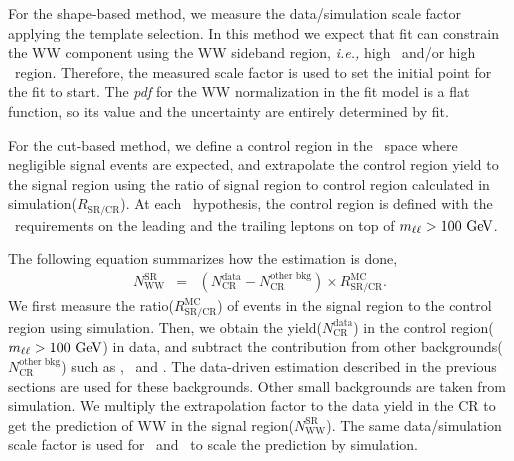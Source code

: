 For the shape-based method, we measure the data/simulation scale factor 
applying the template selection. 
In this method we expect that fit can constrain the WW component using 
the WW sideband region, \textit{i.e.,} high \mT\ and/or high \mll\ region. Therefore,   
the measured scale factor is used to set the initial point for the fit to start. 
The \textit{pdf} for the WW normalization in the fit model is a flat function, 
so its value and the uncertainty are entirely determined by fit. 

For the cut-based method, we define a control region in the \mll\ space where 
negligible signal events are expected, and extrapolate the control region yield 
to the signal region using the ratio of signal region to control region calculated 
in simulation($R_{\textrm{SR/CR}}$). 
At each \mHi\ hypothesis, the control region is defined with the \pt\ requirements 
on the leading and the trailing leptons on top of $m_{\ell\ell}>100~\mathrm{Ge\kern -0.1em V}$. 

The following equation summarizes how the estimation is done, 
\begin{eqnarray} 
N_{\textrm{WW}}^{\textrm{SR}} 
&=&  
\left( N_{\textrm{CR}}^{\textrm{data}}  
     - N_{\textrm{CR}}^{\textrm{other bkg}}\right) \times R_\textrm{SR/CR}^{\textrm{MC}}.  
\end{eqnarray} 
We first measure the ratio($R_\textrm{SR/CR}^{\textrm{MC}}$) of events in the signal region 
to the control region using simulation.  
Then, we obtain the yield($N_{\textrm{CR}}^{\textrm{data}}$) in the 
control region($m_{\ell\ell}>100~\mathrm{Ge\kern -0.1em V}$) in data, and subtract the contribution from other 
backgrounds($N_{\textrm{CR}}^{\textrm{other bkg}}$) such as \topbkg, \Wjets\ and \dyll.  
The data-driven estimation described in the previous sections are used for 
these backgrounds. Other small backgrounds are taken from simulation. 
We multiply the extrapolation factor to the data yield in the CR 
to get the prediction of WW in the signal region($N_{\textrm{WW}}^{\textrm{SR}}$).
The same data/simulation scale factor is used for \qqww\ and \ggww\ to scale 
the prediction by simulation. 

